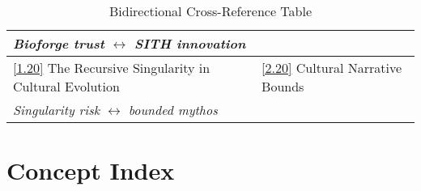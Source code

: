 \documentclass[12pt,a4paper]{article}
\newcommand{\essayref}[2]{\hyperref[sec:essay#1-#2]{[#1.#2]}}
\begin{document}
\begin{table}[ht]
\begin{tabular}{@{}p{}p{}@{}}
\emph{Bioforge trust} $\leftrightarrow$ \emph{SITH innovation} & \\
\midrule
\essayref{1}{20} The Recursive Singularity in Cultural Evolution & \essayref{2}{20} Cultural Narrative Bounds \\
\emph{Singularity risk} $\leftrightarrow$ \emph{bounded mythos} & \\
\bottomrule
\end{tabular}
\caption{Bidirectional Cross-Reference Table}
\end{table}

\section{Concept Index}
\label{sec:index}
\end{document}
